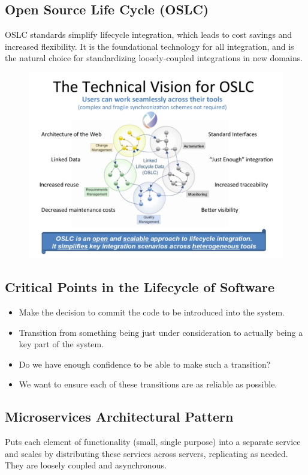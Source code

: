 \documentclass[a4paper]{article}
\begin{document}
\subsection{Open Source Life Cycle (OSLC)}
OSLC standards simplify lifecycle integration, which leads to cost savings and increased flexibility.
It is the foundational technology for all integration, and is the natural choice for standardizing loosely-coupled integrations in new domains. 

\begin{figure}[H]
\begin{center} 
    \hskip-2.0cm\includegraphics[scale=0.3]{images/OSLC.pdf}
\end{center}
\end{figure}

\subsection{Critical Points in the Lifecycle of Software}
\begin{itemize}
\item  Make the decision to commit the code to be introduced into the system.
\item  Transition from something being just under consideration to actually being a key part of the system.
\item  Do we have enough confidence to be able to make such a transition?
\item  We want to ensure each of these transitions are as reliable as possible. 
\end{itemize}

\subsection{Microservices Architectural Pattern}
Puts each element of functionality (small, single purpose) into a separate service and scales by distributing these services across servers, replicating as needed. They are loosely coupled and asynchronous.
\end{document}
